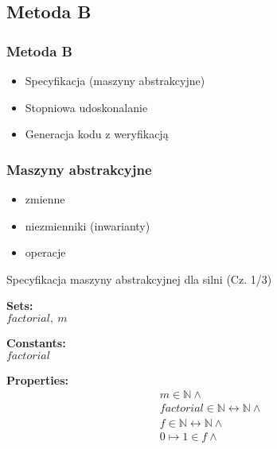 \documentclass{beamer}
\begin{document}
\subsection{Metoda B}
\begin{frame}
\frametitle{Metoda B}
\begin{itemize}
\item Specyfikacja (maszyny abstrakcyjne)
\item Stopniowa udoskonalanie
\item Generacja kodu z weryfikacją
\end{itemize}
\end{frame}

\begin{frame}
\frametitle{Maszyny abstrakcyjne}

\begin{itemize}
    \item zmienne
    \item niezmienniki (inwarianty)
    \item operacje
\end{itemize}
\end{frame}

\begin{frame}{Specyfikacja maszyny abstrakcyjnej dla silni (Cz. 1/3)}
\begin{tcolorbox}[colback=white, colframe=blue!30!black, title=Machine FACTORIAL\_MAC]
\textbf{Sets:} \\
$\textit{factorial},\ m$

\textbf{Constants:} \\
$\textit{factorial}$

\textbf{Properties:}
\[
\begin{aligned}
& m \in \mathbb{N} \land \\
& \textit{factorial} \in \mathbb{N} \leftrightarrow \mathbb{N} \land \\
& f \in \mathbb{N} \leftrightarrow \mathbb{N} \land \\
& 0 \mapsto 1 \in f \land \\
\end{aligned}
\]
\end{tcolorbox}
\end{frame}
\end{document}
